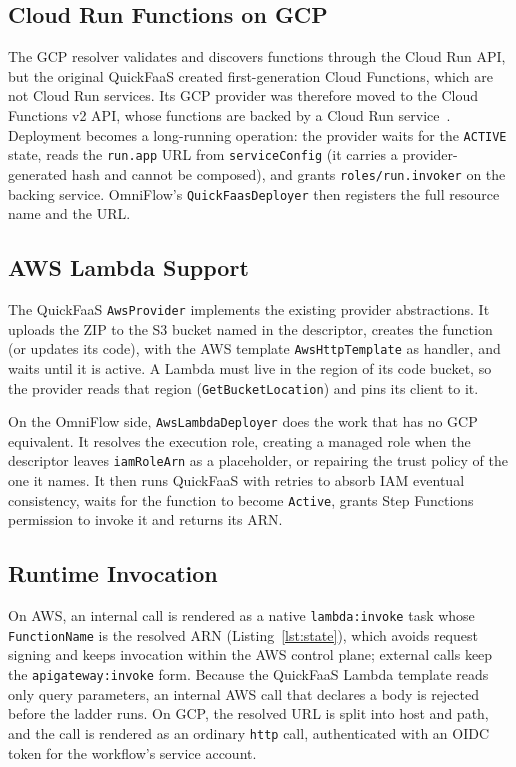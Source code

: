 \documentclass[conference]{IEEEtran}
\begin{document}
\subsection{Cloud Run Functions on GCP}
The GCP resolver validates and discovers functions through the Cloud Run API, but the original
QuickFaaS created first-generation Cloud Functions, which are not Cloud Run services. Its GCP
provider was therefore moved to the Cloud Functions v2 API, whose functions are backed by a Cloud
Run service~\cite{gcpFunctionsVersionComparison}. Deployment becomes a long-running operation: the
provider waits for the \texttt{ACTIVE} state, reads the \texttt{run.app} URL from
\texttt{serviceConfig} (it carries a provider-generated hash and cannot be composed), and grants
\texttt{roles/run.invoker} on the backing service. OmniFlow's \texttt{QuickFaasDeployer} then
registers the full resource name and the URL.

\subsection{AWS Lambda Support}
The QuickFaaS \texttt{AwsProvider} implements the existing provider abstractions. It uploads the
ZIP to the S3 bucket named in the descriptor, creates the function (or updates its code), with the
AWS template \texttt{AwsHttpTemplate} as handler, and waits until it is active. A Lambda must
live in the region of its code bucket, so the provider reads that region
(\texttt{GetBucketLocation}) and pins its client to it.

On the OmniFlow side, \texttt{AwsLambdaDeployer} does the work that has no GCP equivalent. It
resolves the execution role, creating a managed role when the descriptor leaves
\texttt{iamRoleArn} as a placeholder, or repairing the trust policy of the one it names. It then
runs QuickFaaS with retries to absorb IAM eventual consistency, waits for the function to become
\texttt{Active}, grants Step Functions permission to invoke it and returns its ARN.

\subsection{Runtime Invocation}
On AWS, an internal call is rendered as a native \texttt{lambda:invoke} task whose
\texttt{FunctionName} is the resolved ARN (Listing~\ref{lst:state}), which avoids request signing
and keeps invocation within the AWS control plane; external calls keep the
\texttt{apigateway:invoke} form. Because the QuickFaaS Lambda template reads only query parameters,
an internal AWS call that declares a body is rejected before the ladder runs. On GCP, the resolved
URL is split into host and path, and the call is rendered as an ordinary \texttt{http} call,
authenticated with an OIDC token for the workflow's service account.
\end{document}
